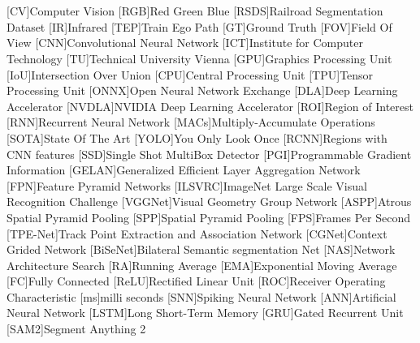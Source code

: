 {}
\chapter*{\listacroname}
\begin{acronym}[XXXXX]
    [CV]{Computer Vision}
    [RGB]{Red Green Blue}
    [RSDS]{Railroad Segmentation Dataset}
    [IR]{Infrared}
    [TEP]{Train Ego Path}
    [GT]{Ground Truth}
    [FOV]{Field Of View}
    [CNN]{Convolutional Neural Network}
    [ICT]{Institute for Computer Technology}
    [TU]{Technical University Vienna}
    [GPU]{Graphics Processing Unit}
    [IoU]{Intersection Over Union}
    [CPU]{Central Processing Unit}
    [TPU]{Tensor Processing Unit}
    [ONNX]{Open Neural Network Exchange}
    [DLA]{Deep Learning Accelerator}
    [NVDLA]{NVIDIA Deep Learning Accelerator}
    [ROI]{Region of Interest}
    [RNN]{Recurrent Neural Network}
    [MACs]{Multiply-Accumulate Operations}
    [SOTA]{State Of The Art}
    [YOLO]{You Only Look Once}
    [RCNN]{Regions with CNN features}
    [SSD]{Single Shot MultiBox Detector}
    [PGI]{Programmable Gradient Information}
    [GELAN]{Generalized Efficient Layer Aggregation Network}
    [FPN]{Feature Pyramid Networks}
    [ILSVRC]{ImageNet Large Scale Visual Recognition Challenge}
    [VGGNet]{Visual Geometry Group Network}
    [ASPP]{Atrous Spatial Pyramid Pooling}
    [SPP]{Spatial Pyramid Pooling}
    [FPS]{Frames Per Second}
    [TPE-Net]{Track Point Extraction and Association Network}
    [CGNet]{Context Grided Network}
    [BiSeNet]{Bilateral Semantic segmentation Net}
    [NAS]{Network Architecture Search}
    [RA]{Running Average}
    [EMA]{Exponential Moving Average}
    [FC]{Fully Connected}
    [ReLU]{Rectified Linear Unit}
    [ROC]{Receiver Operating Characteristic}
    [ms]{milli seconds}
    [SNN]{Spiking Neural Network}
    [ANN]{Artificial Neural Network}
    [LSTM]{Long Short-Term Memory}
    [GRU]{Gated Recurrent Unit}
    [SAM2]{Segment Anything 2}
\end{acronym}